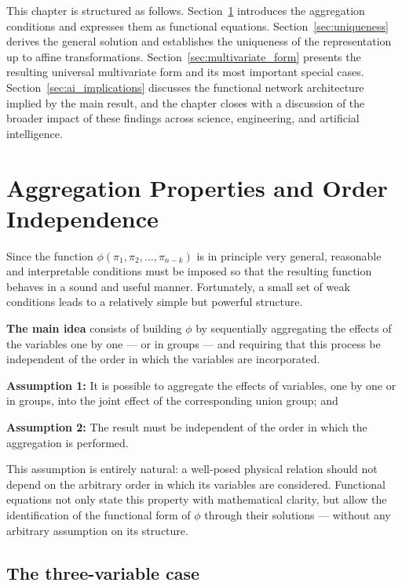 This chapter is structured as follows. Section~\ref{sec:agg_properties} introduces the aggregation conditions and expresses them as
functional equations. Section~\ref{sec:uniqueness} derives the general solution and establishes
the uniqueness of the representation up to affine transformations.
Section~\ref{sec:multivariate_form} presents the resulting universal multivariate form and its most
important special cases. Section~\ref{sec:ai_implications} discusses the functional network
architecture implied by the main result, and the chapter closes with a discussion of
the broader impact of these findings across science, engineering, and artificial
intelligence.

\section{Aggregation Properties and Order Independence}\label{sec:agg_properties}

Since the function $\phi(\pi_1,\pi_2,\ldots,\pi_{n-k})$ is in principle very general,
reasonable and interpretable conditions must be imposed so that the resulting function
behaves in a sound and useful manner. Fortunately, a small set of weak conditions
leads to a relatively simple but powerful structure.

\textbf{The main idea} consists of building $\phi$ by sequentially aggregating the
effects of the variables one by one — or in groups — and requiring that this process
be independent of the order in which the variables are incorporated.

\textbf{Assumption 1:} It is possible to aggregate the effects of variables,
one by one or in groups, into the joint effect of the corresponding union group; and


\textbf{Assumption 2:} The result must be independent of the order in which the aggregation is performed.

This assumption is entirely natural: a well-posed physical relation should not depend
on the arbitrary order in which its variables are considered. Functional equations
not only state this property with mathematical clarity, but allow the identification
of the functional form of $\phi$ through their solutions — without any arbitrary
assumption on its structure.

\subsection*{The three-variable case}

